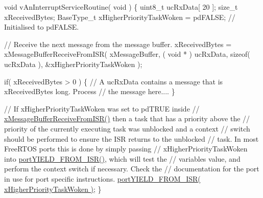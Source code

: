 \begin{DoxyPre}void vAnInterruptServiceRoutine( void )
\{
uint8\_t ucRxData[ 20 ];
size\_t xReceivedBytes;
BaseType\_t xHigherPriorityTaskWoken = pdFALSE;  // Initialised to pdFALSE.\end{DoxyPre}



\begin{DoxyPre} // Receive the next message from the message buffer.
 xReceivedBytes = xMessageBufferReceiveFromISR( xMessageBuffer,
                                               ( void * ) ucRxData,
                                               sizeof( ucRxData ),
                                               \&xHigherPriorityTaskWoken );\end{DoxyPre}



\begin{DoxyPre} if( xReceivedBytes > 0 )
 \{
     // A ucRxData contains a message that is xReceivedBytes long.  Process
     // the message here....
 \}\end{DoxyPre}



\begin{DoxyPre} // If xHigherPriorityTaskWoken was set to pdTRUE inside
 // \hyperlink{message__buffer_8h_adf596c00c44752a3c8c542cc6b5df234}{xMessageBufferReceiveFromISR()} then a task that has a priority above the
 // priority of the currently executing task was unblocked and a context
 // switch should be performed to ensure the ISR returns to the unblocked
 // task.  In most FreeRTOS ports this is done by simply passing
 // xHigherPriorityTaskWoken into \hyperlink{externals_2freertos_2portable_2_g_c_c_2_a_r_m___c_m0_2portmacro_8h_aac6850c66595efdc02a8bbb95fb4648e}{portYIELD\_FROM\_ISR()}, which will test the
 // variables value, and perform the context switch if necessary.  Check the
 // documentation for the port in use for port specific instructions.
 \hyperlink{vendor_2ceedling_2plugins_2freertos_2vendor_2freertos_2portable_2_g_c_c_2_p_o_s_i_x_2portmacro_8h_aac6850c66595efdc02a8bbb95fb4648e}{portYIELD\_FROM\_ISR( xHigherPriorityTaskWoken )};
\}
\end{DoxyPre}
 